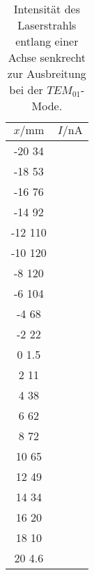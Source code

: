 \begin{table}
    \centering
    \caption{Intensität des Laserstrahls entlang einer Achse senkrecht zur Ausbreitung bei der $TEM_{01}$-Mode.}
    \label{tab:mode01_data}
    \begin{tabular}{c c}
        \toprule
        $x/\si{\milli\meter}$ & $I/\si{\nano\ampere} $ \\
        \midrule
        -20 34\\
        -18 53\\
        -16 76\\
        -14 92\\
        -12 110\\
        -10 120\\
        -8  120\\
        -6  104\\
        -4  68\\
        -2  22\\
        0   1.5\\
        2   11\\
        4   38\\
        6   62\\
        8   72\\
        10  65\\
        12  49\\
        14  34\\
        16  20\\
        18  10\\
        20  4.6\\
        \bottomrule
    \end{tabular}
\end{table}
